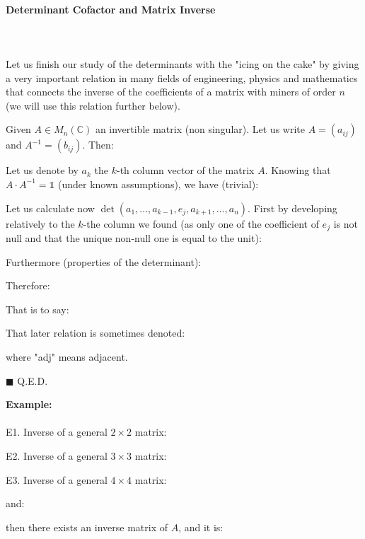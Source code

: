 	\paragraph{Determinant Cofactor and Matrix Inverse}\label{determinant matrix inverse}\mbox{}\\\\
	Let us finish our study of the determinants with the "icing on the cake" by giving a very important relation in many fields of engineering, physics and mathematics that connects the inverse of the coefficients of a matrix with miners of order $n$ (we will use this relation further below).
	
	Given $A\in M_n(\mathbb{C})$ an invertible matrix (non singular). Let us write $A=(a_{ij})$ and $A^{-1}=(b_{ij})$. Then:
	
	\begin{dem}
	Let us denote by $a_k$ the $k$-th column vector of the matrix $A$. Knowing that $A\cdot A^{-1}=\mathds{1}$ (under known assumptions), we have (trivial):
	
	Let us calculate now $\det(a_1,\ldots,a_{k-1},e_j,a_{k+1},\ldots,a_n)$. First by developing relatively to the $k$-the column we found (as only one of the coefficient of $e_j$ is not null and that the unique non-null one is equal to the unit):
	
	Furthermore (properties of the determinant):
	
	Therefore:
	
	That is to say\label{inverse matrix}:
	
	That later relation is sometimes denoted:
	
	where "adj" means adjacent.
	\begin{flushright}
		$\blacksquare$  Q.E.D.
	\end{flushright}
	\end{dem}
	\label{some matrix inverse}
	\begin{tcolorbox}[colframe=black,colback=white,sharp corners]
	\textbf{{\Large {}}Example:}\\\\
	E1. Inverse of a general $2\times 2$ matrix:
	
	
	E2. Inverse of a general $3\times 3$ matrix:
		
	
	E3. Inverse of a general $4\times 4$ matrix:
	
	and:
	
	then there exists an inverse matrix of $A$, and it is:
	
	\end{tcolorbox}
	
